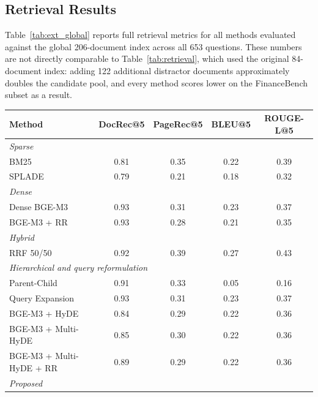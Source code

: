 \documentclass[12pt,twoside,maitrise]{dms}
\theoremstyle{definition}
\numberwithin{equation}{section}
\numberwithin{table}{chapter}
\numberwithin{figure}{chapter}
\begin{document}
\subsection{Retrieval Results}
\label{sec:extension_results}

Table~\ref{tab:ext_global} reports full retrieval metrics for all methods evaluated
against the global 206-document index across all 653 questions. These numbers are not
directly comparable to Table~\ref{tab:retrieval}, which used the original 84-document
index: adding 122 additional distractor documents approximately doubles the candidate
pool, and every method scores lower on the FinanceBench subset as a result. 

\begin{table}[ht]
\centering
\scriptsize
\renewcommand{\arraystretch}{0.88}
\setlength{\tabcolsep}{3pt}
\begin{tabularx}{\textwidth}{Xcccc}
\toprule
\textbf{Method} & \textbf{DocRec@5} & \textbf{PageRec@5} & \textbf{BLEU@5} & \textbf{ROUGE-L@5} \\
\midrule
\multicolumn{5}{l}{\textit{Sparse}} \\
BM25                       & 0.81 & 0.35 & 0.22 & 0.39 \\
SPLADE                     & 0.79 & 0.21 & 0.18 & 0.32 \\
\midrule
\multicolumn{5}{l}{\textit{Dense}} \\
Dense BGE-M3               & 0.93 & 0.31 & 0.23 & 0.37 \\
BGE-M3 + RR                & 0.93 & 0.28 & 0.21 & 0.35 \\
\midrule
\multicolumn{5}{l}{\textit{Hybrid}} \\
RRF 50/50                  & 0.92 & 0.39 & 0.27 & 0.43 \\
\midrule
\multicolumn{5}{l}{\textit{Hierarchical and query reformulation}} \\
Parent-Child               & 0.91 & 0.33 & 0.05 & 0.16 \\
Query Expansion            & 0.93 & 0.31 & 0.23 & 0.37 \\
BGE-M3 + HyDE              & 0.84 & 0.29 & 0.22 & 0.36 \\
BGE-M3 + Multi-HyDE        & 0.85 & 0.30 & 0.22 & 0.36 \\
BGE-M3 + Multi-HyDE + RR   & 0.89 & 0.29 & 0.22 & 0.36 \\
\midrule
\multicolumn{5}{l}{\textit{Proposed}} \\

\end{tabularx}
\end{table}
\end{document}
